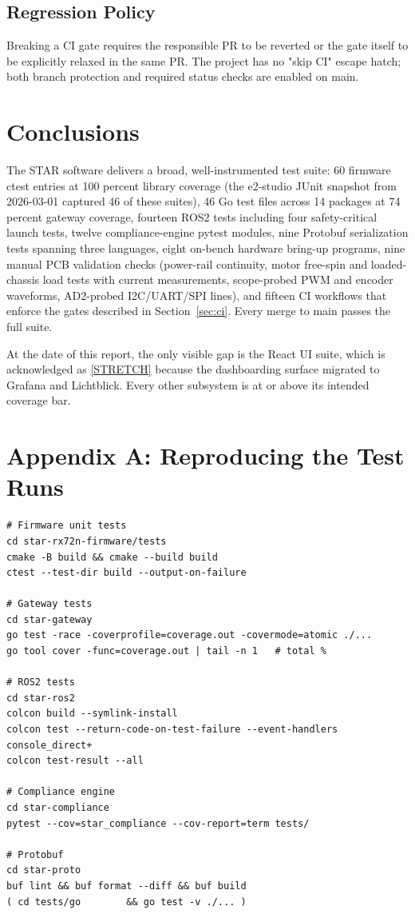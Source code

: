 \documentclass[11pt,letterpaper]{article}
\newcommand{\statuslabel}[1]{\hyperref[sec:status-legend]{[#1]}}
\begin{document}
\subsection{Regression Policy}
Breaking a CI gate requires the responsible PR to be reverted or
the gate itself to be explicitly relaxed in the same PR. The
project has no "skip CI" escape hatch; both branch protection and
required status checks are enabled on main.

\section{Conclusions}
\label{sec:conclusions}

The STAR software delivers a broad, well-instrumented test suite:
60 firmware ctest entries at 100 percent library coverage (the
e2-studio JUnit snapshot from 2026-03-01 captured 46 of these
suites), 46 Go test files across 14 packages at 74 percent gateway
coverage, fourteen ROS2 tests including four safety-critical
launch tests, twelve compliance-engine pytest modules, nine
Protobuf serialization tests spanning three languages, eight
on-bench hardware bring-up programs, nine manual PCB validation
checks (power-rail continuity, motor free-spin and loaded-chassis
load tests with current measurements, scope-probed PWM and
encoder waveforms, AD2-probed I2C/UART/SPI lines), and fifteen
CI workflows that enforce the gates described in
Section~\ref{sec:ci}. Every merge to main passes the full suite.

At the date of this report, the only visible gap is the React UI
suite, which is acknowledged as \statuslabel{STRETCH} because the dashboarding
surface migrated to Grafana and Lichtblick. Every other subsystem
is at or above its intended coverage bar.

\section*{Appendix A: Reproducing the Test Runs}

\begin{lstlisting}[style=shellcmd]
# Firmware unit tests
cd star-rx72n-firmware/tests
cmake -B build && cmake --build build
ctest --test-dir build --output-on-failure

# Gateway tests
cd star-gateway
go test -race -coverprofile=coverage.out -covermode=atomic ./...
go tool cover -func=coverage.out | tail -n 1   # total %

# ROS2 tests
cd star-ros2
colcon build --symlink-install
colcon test --return-code-on-test-failure --event-handlers console_direct+
colcon test-result --all

# Compliance engine
cd star-compliance
pytest --cov=star_compliance --cov-report=term tests/

# Protobuf
cd star-proto
buf lint && buf format --diff && buf build
( cd tests/go        && go test -v ./... )
\end{lstlisting}
\end{document}
